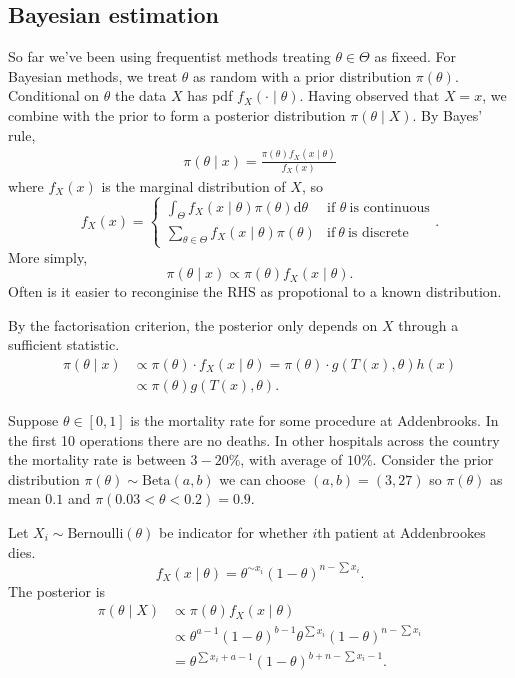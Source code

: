 \documentclass{article}
\begin{document}
\subsection{Bayesian estimation}
So far we've been using frequentist methods treating $ \theta\in\Theta $ as fixeed. For Bayesian methods, we treat $ \theta $ as random with a prior distribution $ \pi(\theta) $. Conditional on $ \theta $ the data $ X $ has pdf $ f_X(\cdot\mid \theta) $. Having observed that $ X=x $, we combine with the prior to form a posterior distribution $ \pi(\theta\mid X) $. By Bayes' rule,
\begin{align*}
	\pi(\theta\mid x) = \frac{\pi(\theta)f_X(x\mid \theta)}{f_X(x)}
\end{align*}
where $ f_X(x) $ is the marginal distribution of $ X $, so
\[
  f_X(x) = \begin{cases}
	  \int_\Theta f_X(x\mid \theta)\pi(\theta) \mathrm d\theta & \text{if }\theta \ \text{is continuous}\\
	  \sum_{\theta\in \Theta} f_X(x\mid \theta)\pi(\theta) & \text{if}\ \theta\ \text{is discrete}
  \end{cases}.
\]
More simply,
\[
  \pi(\theta \mid x)\propto \pi(\theta)f_X(x\mid \theta).
\]
Often is it easier to reconginise the RHS as propotional to a known distribution. 
\begin{remark}
  By the factorisation criterion, the posterior only depends on $ X $ through a sufficient statistic.
  \begin{align*}
	  \pi(\theta\mid x)&\propto \pi(\theta) \cdot f_X(x\mid \theta) = \pi(\theta)\cdot g(T(x),\theta)h(x)\\
			   &\propto \pi(\theta)g(T(x),\theta).
  \end{align*}
\end{remark}
Suppose $ \theta\in [0,1] $ is the mortality rate for some procedure at Addenbrooks. In the first 10 operations there are no deaths. In other hospitals across the country the mortality rate is between $ 3-20\% $, with average of $ 10\% $. Consider the prior distribution $ \pi(\theta)\sim \text{Beta}(a,b) $ we can choose $ (a,b) = (3,27) $ so $ \pi(\theta) $ as mean $ 0.1 $ and $ \pi(0.03 <\theta<0.2) = 0.9 $.
\par
Let $ X_i\sim \text{Bernoulli}(\theta) $ be indicator for whether $ i $th patient at Addenbrookes dies.
\[
	f_X(x\mid \theta) = \theta^{\sim x_i}(1-\theta)^{n-\sum x_i}.
\]
The posterior is
\begin{align*}
	\pi(\theta\mid X) &\propto \pi(\theta)f_X(x\mid \theta) \\
			  &\propto \theta^{a-1}(1-\theta)^{b-1} \theta^{\sum x_i}(1-\theta)^{n-\sum x_i}\\
			  &= \theta^{\sum x_i+a-1}(1-\theta)^{b+n-\sum x_i-1}.
\end{align*}
\end{document}
